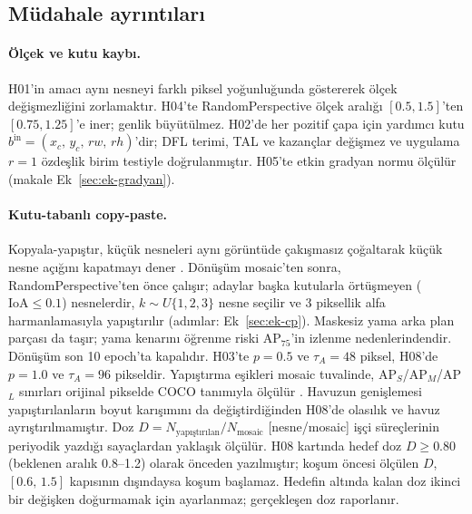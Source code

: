 \subsection{Müdahale ayrıntıları}\label{sec:ek-mudahale}
\paragraph{Ölçek ve kutu kaybı.}
H01'in amacı aynı nesneyi farklı piksel yoğunluğunda göstererek ölçek değişmezliğini zorlamaktır. H04'te RandomPerspective ölçek aralığı $[0.5,1.5]$'ten $[0.75,1.25]$'e iner; genlik büyütülmez. H02'de her pozitif çapa için yardımcı kutu $b^{\mathrm{in}}=(x_c,\,y_c,\,rw,\,rh)$'dir; DFL terimi, TAL ve kazançlar değişmez ve uygulama $r=1$ özdeşlik birim testiyle doğrulanmıştır. H05'te etkin gradyan normu ölçülür (makale Ek~\ref{sec:ek-gradyan}).

\paragraph{Kutu-tabanlı copy-paste.}
Kopyala-yapıştır, küçük nesneleri aynı görüntüde çakışmasız çoğaltarak küçük nesne açığını kapatmayı dener \cite{kisantal_2019_smallaug}. Dönüşüm mosaic'ten sonra, RandomPerspective'ten önce çalışır; adaylar başka kutularla örtüşmeyen ($\mathrm{IoA}\le0.1$) nesnelerdir, $k\sim U\{1,2,3\}$ nesne seçilir ve 3 piksellik alfa harmanlamasıyla yapıştırılır (adımlar: Ek~\ref{sec:ek-cp}). Maskesiz yama arka plan parçası da taşır; yama kenarını öğrenme riski AP$_{75}$'in izlenme nedenlerindendir. Dönüşüm son 10 epoch'ta kapalıdır. H03'te $p=0.5$ ve $\tau_A=48$ piksel, H08'de $p=1.0$ ve $\tau_A=96$ pikseldir. Yapıştırma eşikleri mosaic tuvalinde, AP$_S$/AP$_M$/AP$_L$ sınırları orijinal pikselde COCO tanımıyla ölçülür \cite{lin_2014_coco}. Havuzun genişlemesi yapıştırılanların boyut karışımını da değiştirdiğinden H08'de olasılık ve havuz ayrıştırılmamıştır. Doz $D=N_{\text{yapıştırılan}}/N_{\mathrm{mosaic}}$ [nesne/mosaic] işçi süreçlerinin periyodik yazdığı sayaçlardan yaklaşık ölçülür. H08 kartında hedef doz $D\ge0.80$ (beklenen aralık 0.8--1.2) olarak önceden yazılmıştır; koşum öncesi ölçülen $D$, $[0.6,\,1.5]$ kapısının dışındaysa koşum başlamaz. Hedefin altında kalan doz ikinci bir değişken doğurmamak için ayarlanmaz; gerçekleşen doz raporlanır.

